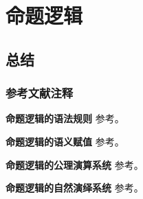 \chapter{命题逻辑}




\section{总结}

\subsection{参考文献注释}

\textbf{命题逻辑的语法规则} 参考\textcite[2.2 语言]{mathematical_logic_1}。

\textbf{命题逻辑的语义赋值} 参考\textcite[1.3 命题演算的语义]{mathematical_logic_2}。

\textbf{命题逻辑的公理演算系统} 参考\textcite[1.2 命题演算的建立]{mathematical_logic_2}。

\textbf{命题逻辑的自然演绎系统} 参考\textcite[2.4 Natural Deduction]{mathematical_logic_and_computation}。

\newpage